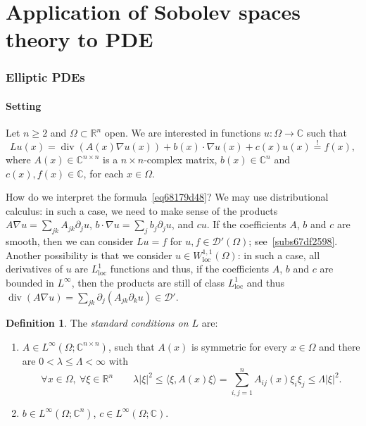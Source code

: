 \documentclass[a4paper,9pt]{amsart}
\newcommand{\scr}[1]{\mathscr{#1}}
\newcommand{\R}{\mathbb{R}}	%
\newcommand{\C}{\mathbb{C}}	%
\newcommand{\de}{\partial}		%
\renewcommand{\div}{\operatorname{div}}	%
\newcommand{\loc}{\mathrm{loc}}
\newcommand{\grad}{\nabla}
\theoremstyle{plain}
\theoremstyle{definition}
\newtheorem{definition}[proposition]{Definition}
\theoremstyle{remark}
\begin{document}
\part{Application of Sobolev spaces theory to PDE}
\section{Elliptic PDEs}

\subsection{Setting}\label{subs6817a5f7}
Let $n\ge 2$ and $\Omega\subset\R^n$ open.
We are interested in functions $u:\Omega\to\C$ such that
\begin{equation}\label{eq68179d48}
	Lu(x) = \div(A(x)\grad u(x)) + b(x)\cdot \grad u(x) + c(x) u(x) 
	\overset{!}{=} f(x) ,
\end{equation}
where $A(x)\in \C^{n\times n}$ is a $n\times n$-complex matrix, $b(x)\in \C^n$ and $c(x),f(x)\in\C$, for each $x\in\Omega$.

How do we interpret the formula~\eqref{eq68179d48}?
We may use distributional calculus: in such a case, we need to make sense of the products
$A\grad u = \sum_{jk} A_{jk}\de_j u$,
$b\cdot\grad u =  \sum_j b_j\de_j u$,
and $cu$.
If the coefficients $A$, $b$ and $c$ are smooth, then we can consider $Lu=f$ for $u,f\in\scr D'(\Omega)$;
see~\ref{subs67df2598}.
Another possibility is that we consider $u\in W^{1,1}_\loc(\Omega)$:
in such a case, all derivatives of $u$ are $L^1_\loc$ functions and thus, if the coefficients $A$, $b$ and $c$ are bounded in $L^\infty$, then the products are still of class $L^1_\loc$ and thus $\div(A\grad u) = \sum_{jk} \de_j(A_{jk} \de_ku) \in\scr D'$.


\begin{definition}\label{def6817a806}
	The \emph{standard conditions on $L$} are:
	\begin{enumerate}
	\item 
	$A\in L^\infty(\Omega;\C^{n\times n})$, such that $A(x)$ is symmetric for every $x\in\Omega$ and 
	there are $0<\lambda\le \Lambda<\infty$ with 
		\begin{equation}\label{eq68179d12}
			\forall x\in\Omega,\ \forall\xi\in\R^n
			\qquad
			\lambda |\xi|^2 \le 
			\langle \xi,A(x)\xi \rangle = \sum_{i,j=1}^n A_{ij}(x) \xi_i\xi_j
			\le \Lambda |\xi|^2 .
		\end{equation}
	\item
	$b\in L^\infty(\Omega;\C^n)$, $c\in L^\infty(\Omega;\C)$.
	\end{enumerate}
\end{definition}
\end{document}
